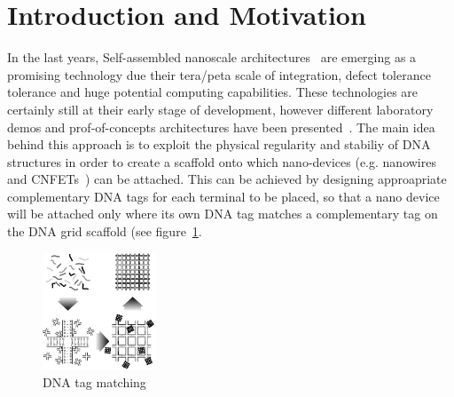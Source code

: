 
\section{Introduction and Motivation}


In the last years, Self-assembled nanoscale architectures~\cite{winfree1998, yan2003}
are emerging as a promising technology due their tera/peta scale of
integration, defect tolerance tolerance and huge potential computing
capabilities. These technologies are certainly still at
their early stage of development, however different laboratory demos and
prof-of-concepts architectures have been presented~\cite{patwardhan2004, patwardhan2006, patwardhan2006_1, pistol2009}.
The main idea behind this approach is to exploit the physical regularity and
stabiliy of DNA structures in order to create a scaffold onto which
nano-devices (e.g. nanowires and CNFETs~\cite{bachtold2001, tans1998, cui2001}) can be
attached. This can be achieved by designing approapriate complementary DNA tags for
each terminal to be placed, so that a nano device will be attached
only where its own DNA tag matches a complementary tag on the DNA grid
scaffold (see figure~\ref{fig:dna_tag}.

\begin{figure}
  \centering
    \includegraphics[width=0.30\textwidth]{pictures/dna2b.eps}
  \caption{DNA tag matching}
  \label{fig:dna_tag}
\end{figure}

